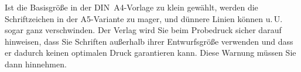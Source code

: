 Ist die Basisgröße in der DIN~A4-Vorlage zu klein gewählt, werden die
Schriftzeichen in der A5-Variante zu mager, und dünnere Linien können u.\,U.
sogar ganz verschwinden. Der Verlag wird Sie beim Probedruck sicher darauf
hinweisen, dass Sie Schriften außerhalb ihrer Entwurfsgröße verwenden und dass
er dadurch keinen optimalen Druck garantieren kann. Diese Warnung müssen Sie
dann hinnehmen.
